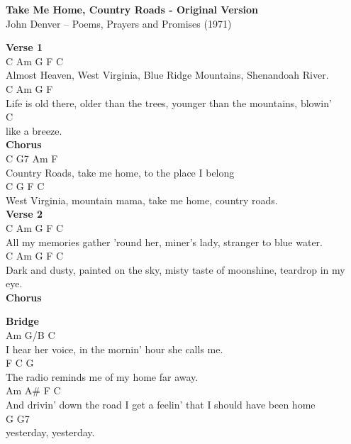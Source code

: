 \documentclass[a4paper]{article}
\begin{document}
    \begin{center}
        \textbf{Take Me Home, Country Roads - Original Version}
        ~\\
        John Denver -- Poems, Prayers and Promises (1971)
    \end{center}
    {
        \scriptsize
        \textbf{Verse 1}
        ~\\
        {
            \cutive
            \obeyspaces
C              Am             G                       F          C
\\
  Almost Heaven, West Virginia, Blue Ridge Mountains, Shenandoah River.
\\
C                    Am                    G                           F
\\
  Life is old there, older than the trees, younger than the mountains, blowin' 
\\
         C
\\
like a breeze.
\\

        }
        \textbf{Chorus}
        ~\\
        {
            \cutive
            \obeyspaces
        C              G7           Am        F
\\
Country Roads, take me home, to the place I belong
\\
        C               G             F             C
\\
West Virginia, mountain mama, take me home, country roads.
\\

        }
        \textbf{Verse 2}
        ~\\
        {
            \cutive
            \obeyspaces
C               Am                 G               F                C
\\
 All my memories  gather 'round her, miner's lady, stranger to blue water.
\\
C                 Am                  G                         F              C
\\
  Dark and dusty, painted on the sky, misty taste of moonshine, teardrop in my eye.
\\

        }
        \textbf{Chorus}
        ~\\
        {
            \cutive
            \obeyspaces

        }
        \textbf{Bridge}
        ~\\
        {
            \cutive
            \obeyspaces
Am          G/B          C
\\
 I hear her voice, in the mornin' hour she calls me.
\\
    F       C              G
\\
The radio reminds me of my home far away.
\\
    Am               A\#           F              C
\\
And drivin' down the road I get a feelin' that I should have been home 
\\
G                G7
\\
yesterday, yesterday.
\\

}}
\end{document}
